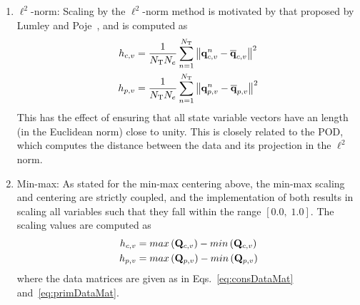 \begin{enumerate}
	\item $\ell^2$-norm: Scaling by the $\ell^2$-norm method is motivated by that proposed by Lumley and Poje~\cite{Lumley1997}, and is computed as
	\begin{align}
		h_{c,v} &= \frac{1}{N_{\text{T}} N_{e}} \sum_{n=1}^{N_{\text{T}}} \left\Vert \mathbf{q}_{c,v}^{n} - \mathbf{\overline{q}}_{c,v} \right\Vert^2 \\
		h_{p,v} &= \frac{1}{N_{\text{T}} N_{e}} \sum_{n=1}^{N_{\text{T}}} \left\Vert \mathbf{q}_{p,v}^{n} - \mathbf{\overline{q}}_{p,v} \right\Vert^2
	\end{align}
	This has the effect of ensuring that all state variable vectors have an length (in the Euclidean norm) close to unity. This is closely related to the POD, which computes the distance between the data and its projection in the $\ell^2$ norm.


	\item Min-max: As stated for the min-max centering above, the min-max scaling and centering are strictly coupled, and the implementation of both results in scaling all variables such that they fall within the range $[0.0, \; 1.0]$. The scaling values are computed as
	\begin{align}
		\consScaleVar{\varIdx} &= max\left(\consDataMatVar\right) - min\left(\consDataMatVar\right) \\
		\primScaleVar{\varIdx} &= max\left(\primDataMatVar\right) - min\left(\primDataMatVar\right)
	\end{align}
	where the data matrices are given as in Eqs.~\ref{eq:consDataMat} and~\ref{eq:primDataMat}.


\end{enumerate}
